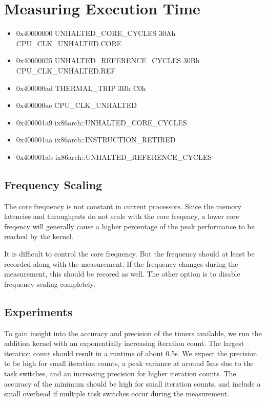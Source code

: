 \documentclass[a4paper,12pt]{article}
\begin{document}
\section{Measuring Execution Time}
\begin{itemize}
\item 0x40000000   UNHALTED\_CORE\_CYCLES 30Ah CPU\_CLK\_UNHALTED.CORE
\item 0x40000025   UNHALTED\_REFERENCE\_CYCLES 30Bh CPU\_CLK\_UNHALTED.REF
\item 0x400000ad   THERMAL\_TRIP 3Bh C0h 
\item 0x400000ae   CPU\_CLK\_UNHALTED
\item 0x400001a9   ix86arch::UNHALTED\_CORE\_CYCLES
\item 0x400001aa   ix86arch::INSTRUCTION\_RETIRED
\item 0x400001ab   ix86arch::UNHALTED\_REFERENCE\_CYCLES 
\end{itemize}

\subsection{Frequency Scaling}
The core frequency is not constant in current processors. Since the memory latencies and throughputs do not scale with the core freqency, a lower core freqency will generally cause a higher percentage of the peak performance to be reached by the kernel.

It is difficult to control the core frequency. But the frequency should at least be recorded along with the measurement. If the frequency changes during the measurement, this should be recored as well. The other option is to disable frequency scaling completely.

\subsection{Experiments}
To gain insight into the accuracy and precision of the timers available, we run the addition kernel with an exponentially increasing iteration count. The largest iteration count should result in a runtime of about 0.5s. We expect the precision to be high for small iteration counts, a peak variance at around 5ms due to the task switches, and an increasing precision for higher iteration counts. The accuracy of the minimum should be high for small iteration counts, and include a small overhead if multiple task switches occur during the measurement.
\end{document}
